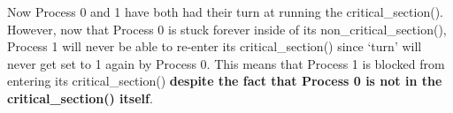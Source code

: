 \documentclass[11pt, letterpaper]{article}
\begin{document}
Now Process 0 and 1 have both had their turn at running the critical\_section().  However, now that Process 0 is stuck forever inside of its non\_critical\_section(), Process 1 will never be able to re-enter its critical\_section() since `turn' will never get set to 1 again by Process 0.  This means that Process 1 is blocked from entering its critical\_section() \textbf{despite the fact that Process 0 is not in the critical\_section() itself}.
\end{document}
